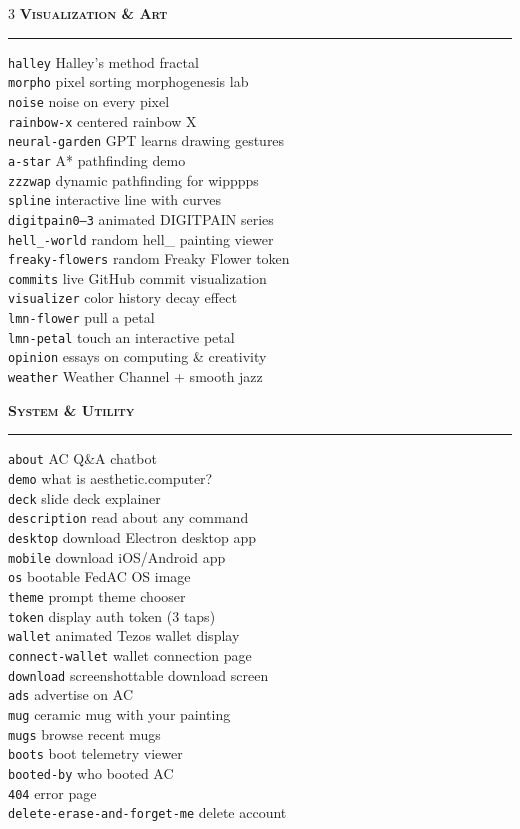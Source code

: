 \documentclass[10pt,letterpaper,twocolumn]{article}
\newcommand{\pe}[2]{\texttt{\color{acpurple}#1} #2}
\newcommand{\peh}[1]{\vspace{0.3em}\noindent\textbf{\textsc{#1}}\par\vspace{0.1em}\hrule\vspace{0.2em}}
\begin{document}
\begin{multicols}{3}
\peh{Visualization \& Art}
\pe{halley}{Halley's method fractal}\\
\pe{morpho}{pixel sorting morphogenesis lab}\\
\pe{noise}{noise on every pixel}\\
\pe{rainbow-x}{centered rainbow X}\\
\pe{neural-garden}{GPT learns drawing gestures}\\
\pe{a-star}{A* pathfinding demo}\\
\pe{zzzwap}{dynamic pathfinding for wipppps}\\
\pe{spline}{interactive line with curves}\\
\pe{digitpain0--3}{animated DIGITPAIN series}\\
\pe{hell\_-world}{random hell\_ painting viewer}\\
\pe{freaky-flowers}{random Freaky Flower token}\\
\pe{commits}{live GitHub commit visualization}\\
\pe{visualizer}{color history decay effect}\\
\pe{lmn-flower}{pull a petal}\\
\pe{lmn-petal}{touch an interactive petal}\\
\pe{opinion}{essays on computing \& creativity}\\
\pe{weather}{Weather Channel + smooth jazz}

\peh{System \& Utility}
\pe{about}{AC Q\&A chatbot}\\
\pe{demo}{what is aesthetic.computer?}\\
\pe{deck}{slide deck explainer}\\
\pe{description}{read about any command}\\
\pe{desktop}{download Electron desktop app}\\
\pe{mobile}{download iOS/Android app}\\
\pe{os}{bootable FedAC OS image}\\
\pe{theme}{prompt theme chooser}\\
\pe{token}{display auth token (3 taps)}\\
\pe{wallet}{animated Tezos wallet display}\\
\pe{connect-wallet}{wallet connection page}\\
\pe{download}{screenshottable download screen}\\
\pe{ads}{advertise on AC}\\
\pe{mug}{ceramic mug with your painting}\\
\pe{mugs}{browse recent mugs}\\
\pe{boots}{boot telemetry viewer}\\
\pe{booted-by}{who booted AC}\\
\pe{404}{error page}\\
\pe{delete-erase-and-forget-me}{delete account}


\end{multicols}
\end{document}
